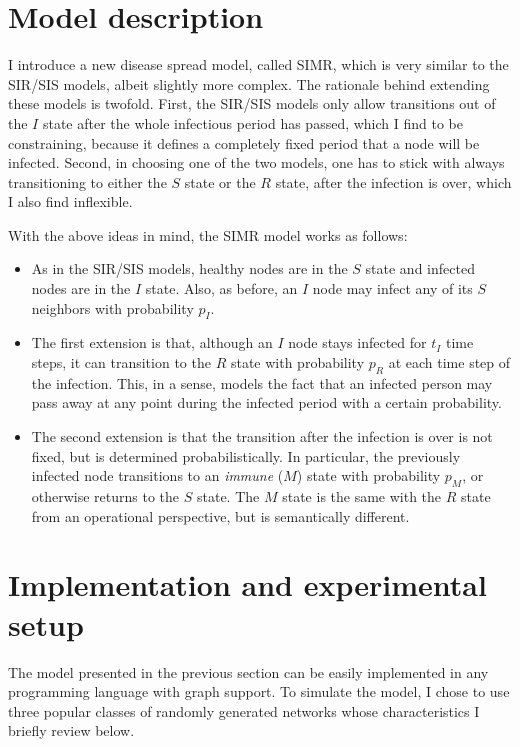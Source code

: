 \documentclass[11pt]{article} %
\begin{document}
\section{Model description}
I introduce a new disease spread model, called SIMR, which is very similar to
the SIR/SIS models, albeit slightly more complex. The rationale behind extending
these models is twofold. First, the SIR/SIS models only allow transitions out
of the $I$ state after the whole infectious period has passed, which I find to be
constraining, because it defines a completely fixed period that a node will be
infected. Second, in choosing one of the two models, one has to stick with
always transitioning to either the $S$ state or the $R$ state, after the infection
is over, which I also find inflexible.

With the above ideas in mind, the SIMR model works as follows:
\begin{itemize}
\item As in the SIR/SIS models, healthy nodes are in the $S$ state and infected
nodes are in the $I$ state. Also, as before, an $I$ node may infect any of its
$S$ neighbors with probability $p_I$.
\item The first extension is that, although an $I$ node stays infected for $t_I$
time steps, it can transition to the $R$ state with probability $p_R$ at each
time step of the infection. This, in a sense, models the fact that an infected
person may pass away at any point during the infected period with a certain
probability.
\item The second extension is that the transition after the infection is over
is not fixed, but is determined probabilistically. In particular, the previously
infected node transitions to an \emph{immune} ($M$) state with probability $p_M$,
or otherwise returns to the $S$ state. The $M$ state is the same with the $R$
state from an operational perspective, but is semantically different.
\end{itemize}

\section{Implementation and experimental setup}
The model presented in the previous section can be easily implemented in any
programming language with graph support. To simulate the model, I chose to use
three popular classes of randomly generated networks whose characteristics
I briefly review below.
\end{document}
